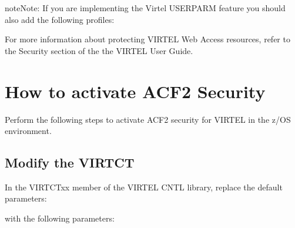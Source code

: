 \documentclass[letterpaper,10pt,english]{sphinxmanual}
\begin{document}
\begin{sphinxadmonition}{note}{Note:}
\sphinxAtStartPar
If you are implementing the Virtel USERPARM feature you should also add the following profiles:

\begin{sphinxVerbatim}[commandchars=\\\{\}]
           
\end{sphinxVerbatim}
\end{sphinxadmonition}

\sphinxAtStartPar
For more information about protecting VIRTEL Web Access resources, refer to the Security section of the the VIRTEL User Guide.

\ignorespaces 

\section{How to activate ACF2 Security}
\label{\detokenize{Installation_Guide:how-to-activate-acf2-security}}\label{\detokenize{Installation_Guide:index-184}}
\sphinxAtStartPar
Perform the following steps to activate ACF2 security for VIRTEL in the z/OS environment.


\subsection{Modify the VIRTCT}
\label{\detokenize{Installation_Guide:id10}}
\sphinxAtStartPar
In the VIRTCTxx member of the VIRTEL CNTL library, replace the default parameters:

\begin{sphinxVerbatim}[commandchars=\\\{\}]
\end{sphinxVerbatim}

\sphinxAtStartPar
with the following parameters:

\begin{sphinxVerbatim}[commandchars=\\\{\}]
\end{sphinxVerbatim}
\end{document}
